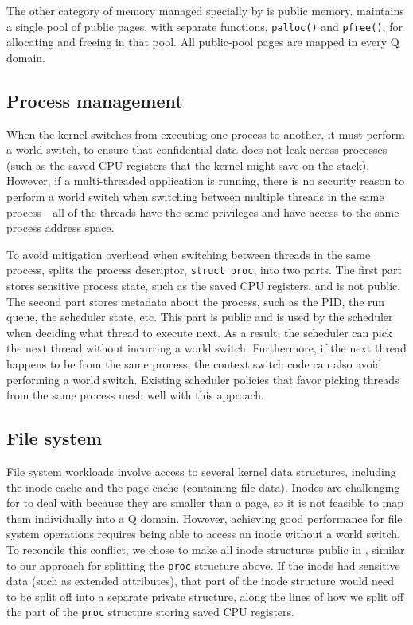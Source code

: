 The other category of memory managed specially by \sys is public memory.
\sys maintains a single pool of public pages, with separate functions,
\texttt{palloc()} and \texttt{pfree()}, for allocating and freeing in
that pool.  All public-pool pages are mapped in every Q domain.


\subsection{Process management}
\label{ss:proc}

When the \sys kernel switches from executing one process to another, it
must perform a world switch, to ensure that confidential data does not
leak across processes (such as the saved CPU registers that the kernel
might save on the stack).  However, if a multi-threaded application
is running, there is no security reason to perform a world switch when
switching between multiple threads in the same process---all of the
threads have the same privileges and have access to the same process
address space.

To avoid mitigation overhead when switching between threads in the
same process, \sys splits the process descriptor, \texttt{struct
  proc}, into two parts.  The first part stores sensitive process
state, such as the saved CPU registers, and is not public.  The second
part stores metadata about the process, such as the PID, the run
queue, the scheduler state, etc.  This part is public and is used by
the scheduler when deciding what thread to execute next.  As a result,
the scheduler can pick the next thread without incurring a world
switch.  Furthermore, if the next thread happens to be from the same
process, the context switch code can also avoid performing a world
switch.  Existing scheduler policies that favor picking threads from
the same process mesh well with this approach.

\subsection{File system}
\label{ss:fs}

File system workloads involve access to several kernel data structures,
including the inode cache and the page cache (containing file data).
Inodes are challenging for \sys to deal with because they are smaller than
a page, so it is not feasible to map them individually into a Q domain.
However, achieving good performance for file system operations requires
being able to access an inode without a world switch.  To reconcile
this conflict, we chose to make all inode structures public in \sys,
similar to our approach for splitting the \texttt{proc} structure above.
If the inode had sensitive data (such as extended attributes), that
part of the inode structure would need to be split off into a separate
private structure, along the lines of how we split off the part of the
\texttt{proc} structure storing saved CPU registers.

